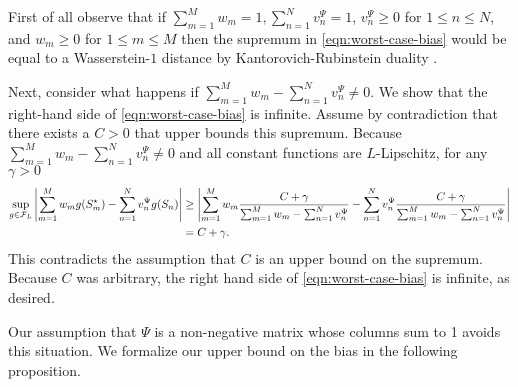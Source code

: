 First of all observe that if $\sum_{m=1}^M w_m = 1, \sum_{n=1}^N v_n^{\Psi} = 1$, $v_n^{\Psi} \geq 0$ for $1 \leq n \leq N$, and $w_m \geq 0$ for $1 \leq m \leq M$ then the supremum in \cref{eqn:worst-case-bias} would be equal to a Wasserstein-$1$ distance by Kantorovich-Rubinstein duality \citep[Theorem 5.10, Case 5.16]{villani2009optimal}.

Next, consider what happens if $\sum_{m=1}^M w_m - \sum_{n=1}^N v_n^{\Psi} \neq 0$. We show that the right-hand side of \cref{eqn:worst-case-bias} is infinite. Assume by contradiction that there exists a $C> 0$ that upper bounds this supremum. Because $\sum_{m=1}^M w_m - \sum_{n=1}^N v_n^{\Psi} \neq 0$ and all constant functions are $L$-Lipschitz, for any $\gamma > 0$
\begin{align}
\sup_{g \in \mathcal{F}_{L}} \left \vert \sum_{m=1}^M w_m g(S^{\star}_m) - \sum_{n=1}^N v_n^{\Psi} g(S_n)\right\vert &\geq \left \vert \sum_{m=1}^M w_m \frac{C + \gamma}{\sum_{m=1}^M w_m - \sum_{n=1}^N v_n^{\Psi}} - \sum_{n=1}^N v_n^{\Psi} \frac{C + \gamma}{\sum_{m=1}^M w_m - \sum_{n=1}^N  v_n^{\Psi}}\right\vert \\
& = C + \gamma.
\end{align}
This contradicts the assumption that $C$ is an upper bound on the supremum. Because $C$ was arbitrary, the right hand side of \cref{eqn:worst-case-bias} is infinite, as desired. 

Our assumption that $\Psi$ is a non-negative matrix whose columns sum to 1 avoids this situation. We formalize our upper bound on the bias in the following proposition.

